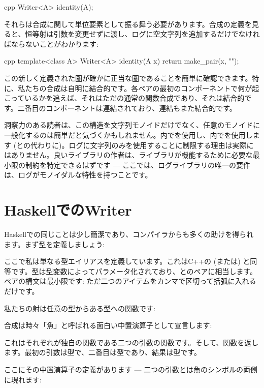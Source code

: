 \begin{snip}{cpp}
Writer<A> identity(A);
\end{snip}
それらは合成に関して単位要素として振る舞う必要があります。合成の定義を見ると、恒等射は引数を変更せずに渡し、ログに空文字列を追加するだけでなければならないことがわかります:

\begin{snip}{cpp}
template<class A> Writer<A> identity(A x) {
    return make_pair(x, "");
}
\end{snip}
この新しく定義された圏が確かに正当な圏であることを簡単に確認できます。特に、私たちの合成は自明に結合的です。各ペアの最初のコンポーネントで何が起こっているかを追えば、それはただの通常の関数合成であり、それは結合的です。二番目のコンポーネントは連結されており、連結もまた結合的です。

洞察力のある読者は、この構造を文字列モノイドだけでなく、任意のモノイドに一般化するのは簡単だと気づくかもしれません。内でを使用し、内でを使用します (\code{+}との代わりに)。ログに文字列のみを使用することに制限する理由は実際にはありません。良いライブラリの作者は、ライブラリが機能するために必要な最小限の制約を特定できるはずです --- ここでは、ログライブラリの唯一の要件は、ログがモノイダルな特性を持つことです。

\section{HaskellでのWriter}

Haskellでの同じことは少し簡潔であり、コンパイラからも多くの助けを得られます。まず型を定義しましょう:

ここで私は単なる型エイリアスを定義しています。これはC++の (または) と同等です。型は型変数によってパラメータ化されており、とのペアに相当します。ペアの構文は最小限です: ただ二つのアイテムをカンマで区切って括弧に入れるだけです。

私たちの射は任意の型からある型への関数です:

合成は時々「魚」と呼ばれる面白い中置演算子として宣言します:

これはそれぞれが独自の関数である二つの引数の関数です。そして、関数を返します。最初の引数は型で、二番目は型であり、結果は型です。

ここにその中置演算子の定義があります --- 二つの引数とは魚のシンボルの両側に現れます:

